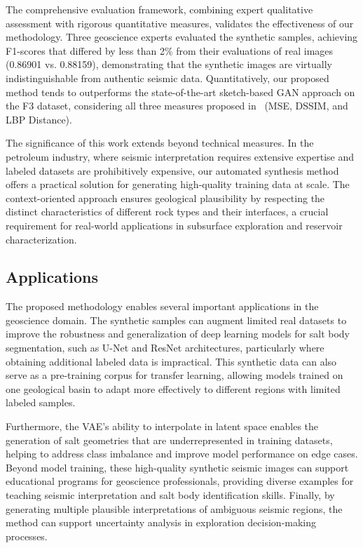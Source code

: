 \documentclass{ieeeaccess}
\begin{document}
The comprehensive evaluation framework, combining expert qualitative assessment with rigorous quantitative measures, validates the effectiveness of our methodology. Three geoscience experts evaluated the synthetic samples, achieving F1-scores that differed by less than 2\% from their evaluations of real images (0.86901 vs. 0.88159), demonstrating that the synthetic images are virtually indistinguishable from authentic seismic data. Quantitatively, our proposed method tends to   outperforms the state-of-the-art sketch-based GAN approach on the F3 dataset, considering all three measures proposed in~\cite{Ferreira2020} (MSE, DSSIM, and LBP Distance). %

The significance of this work extends beyond technical measures. In the petroleum industry, where seismic interpretation requires extensive expertise and labeled datasets are prohibitively expensive, our automated synthesis method offers a practical solution for generating high-quality training data at scale. The context-oriented approach ensures geological plausibility by respecting the distinct characteristics of different rock types and their interfaces, a crucial requirement for real-world applications in subsurface exploration and reservoir characterization.

\subsection{Applications}

The proposed methodology enables several important applications in the geoscience domain. The synthetic samples can augment limited real datasets to improve the robustness and generalization of deep learning models for salt body segmentation, such as U-Net and ResNet architectures, particularly where obtaining additional labeled data is impractical. This synthetic data can also serve as a pre-training corpus for transfer learning, allowing models trained on one geological basin to adapt more effectively to different regions with limited labeled samples.

Furthermore, the VAE's ability to interpolate in latent space enables the generation of salt geometries that are underrepresented in training datasets, helping to address class imbalance and improve model performance on edge cases. Beyond model training, these high-quality synthetic seismic images can support educational programs for geoscience professionals, providing diverse examples for teaching seismic interpretation and salt body identification skills. Finally, by generating multiple plausible interpretations of ambiguous seismic regions, the method can support uncertainty analysis in exploration decision-making processes.
\end{document}
